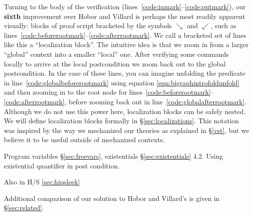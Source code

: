 Turning to the body of the verification (lines~\ref{code:inmark}--\ref{code:outmark}), our \textbf{sixth} improvement over Hobor and Villard is perhaps the most readily apparent visually: blocks of proof script bracketed by the symbols $\searrow$ and $\swarrow$, such as lines~\ref{code:beforerootmark}--\ref{code:afterrootmark}.  We call a bracketed set of lines like this a ``localization block''.  The intuitive idea is that we zoom in from a larger ``global'' context into a smaller ``local'' one.  After verifying some commands locally to arrive at the local postcondition we zoom back out to the global postcondition. In the case of these lines, you can imagine unfolding the  predicate in line~\ref{code:globalbeforerootmark} using equation \eqref{eqn:bigraphintrofoldunfold} and then zooming in to the root node  for lines~\ref{code:beforerootmark}--\ref{code:afterrootmark}, before zooming back out in line~\ref{code:globalafterrootmark}.  Although we do not use this power here, localization blocks can be safely nested.  We will define localization blocks formally in \S\ref{sec:localizations}.
This notation was inspired by the way we mechanized our theories as explained in \S\ref{vst}, but we believe it to be useful outside of mechanized contexts.


Program variables \S\ref{sec:freevars}, existentials \S\ref{sec:existentials} 4.2. Using existential quantifier in post condition.

Also in H/S \ref{sec:hipsleek}

{\color{magenta} Additional comparison of our solution to Hobor and Villard's is given in \S\ref{sec:related}.}


